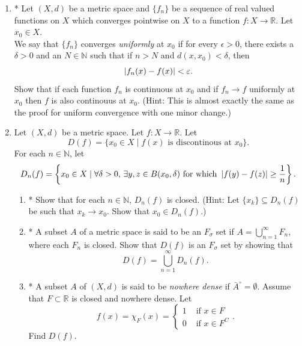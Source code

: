 \documentclass[notoc,notitlepage]{tufte-book}
\begin{document}
\begin{enumerate}
  \item * Let $(X, d)$ be a metric space and $\{ f_n \}$ be a sequence of real valued functions on $X$ which converges pointwise on $X$ to a function $f : X \to \mathbb{R}$. Let $x_0 \in X$. \\
    We say that $\{ f_n \}$ converges \textit{uniformly} at $x_0$ if for every $\epsilon > 0$, there exists a $\delta > 0$ and an $N \in \mathbb{N}$ such that if $n > N$ and $d(x, x_0) < \delta$, then
    \begin{equation*}
      \left| f_n(x) - f(x) \right| < \varepsilon.
    \end{equation*}
    Show that if each function $f_n$ is continuous at $x_0$ and if $f_n \to f$ uniformly at $x_0$ then $f$ is also continouus at $x_0$. (Hint: This is almost exactly the same as the proof for uniform convergence with one minor change.)

  \item Let $(X, d)$ be a metric space. Let $f : X \to \mathbb{R}$. Let
    \begin{equation*}
      D(f) = \{ x_0 \in X \mid f(x) \text{ is discontinous at } x_0 \}.
    \end{equation*}
    For each $n \in \mathbb{N}$, let
    \begin{equation*}
    D_n(f) = \left\{ x_0 \in X \mid \forall \delta > 0, \, \exists y, z \in B(x_0, \delta) \text{ for which } \left| f(y) - f(z)\right| \geq \frac{1}{n} \right\}.
    \end{equation*}
    \begin{enumerate}
      \item * Show that for each $n \in \mathbb{N}$, $D_n(f)$ is closed. (Hint: Let $\{ x_k \} \subseteq D_n(f)$ be such that $x_k \to x_0$. Show that $x_0 \in D_n(f)$.)
      \item * A subset $A$ of a metric space is said to be an $F_\sigma$ set if $A = \bigcup\limits_{n = 1}^{\infty} F_n$, where each $F_n$ is closed. Show that $D(f)$ is an $F_\sigma$ set by showing that
        \begin{equation*}
          D(f) = \bigcup_{n = 1}^{\infty} D_n(f).
        \end{equation*}
      \item * A subset $A$ of $(X, d)$ is said to be \textit{nowhere dense} if $\bar{A}^\circ = \emptyset$. Assume that $F \subset \mathbb{R}$ is closed and nowhere dense. Let
        \begin{equation*}
          f(x) = \chi_F(x) = \begin{cases}
            1 & \text{ if } x \in F \\
            0 & \text{ if } x \in F^C
          \end{cases}.
        \end{equation*}
        Find $D(f)$.


\end{enumerate}
\end{enumerate}
\end{document}
